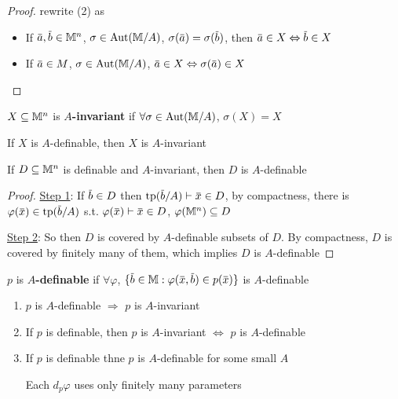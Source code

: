 \documentclass[11pt]{article}
\begin{document}
\begin{proof}
rewrite (2) as
\begin{itemize}
\item If \(\bara,\barb\in\M^n\), \(\sigma\in\operatorname{\text{Aut}}(\mathbb{M}/A)\), \(\sigma(\bara)=\sigma(\barb)\),
then \(\bara\in X\Leftrightarrow\barb\in X\)
\item If \(\bara\in M\), \(\sigma\in\operatorname{\text{Aut}}(\mathbb{M}/A)\), \(\bara\in X\Leftrightarrow\sigma(\bara)\in X\)
\end{itemize}
\end{proof}

\begin{definition}[]
\(X\subseteq\mathbb{M}^n\) is \textbf{\(A\)-invariant} if \(\forall\sigma\in\operatorname{\text{Aut}}(\mathbb{M}/A)\), \(\sigma(X)=X\)
\end{definition}

\begin{examplle}[]
If \(X\) is \(A\)-definable, then \(X\) is \(A\)-invariant
\end{examplle}

\begin{lemma}[]
If \(D\subseteq\mathbb{M}^n\) is definable and \(A\)-invariant, then \(D\) is \(A\)-definable
\end{lemma}

\begin{proof}
\uline{Step 1}: If \(\barb\in D\) then \(\tp(\barb/A)\vdash\barx\in D\), by compactness, there
is \(\varphi(\barx)\in\tp(\barb/A)\) s.t. \(\varphi(\barx)\vdash \barx\in D\), \(\varphi(\mathbb{M}^n)\subseteq D\)

\uline{Step 2}: So then \(D\) is covered by \(A\)-definable subsets of \(D\). By compactness, \(D\) is
covered by finitely many of them, which implies \(D\) is \(A\)-definable
\end{proof}

\begin{definition}[]
\(p\) is \textbf{\(A\)-definable} if \(\forall\varphi\), \(\{\barb\in\M:\varphi(\barx,\barb)\in p(\barx)\}\) is \(A\)-definable
\end{definition}

\begin{remark}
\begin{enumerate}
\item \(p\) is \(A\)-definable \(\Rightarrow\) \(p\) is \(A\)-invariant
\item If \(p\) is definable, then \(p\) is \(A\)-invariant \(\Leftrightarrow\) \(p\) is \(A\)-definable
\item If \(p\) is definable thne \(p\) is \(A\)-definable for some small \(A\)

Each \(d_p\varphi\) uses only finitely many parameters
\end{enumerate}
\end{remark}
\end{document}
